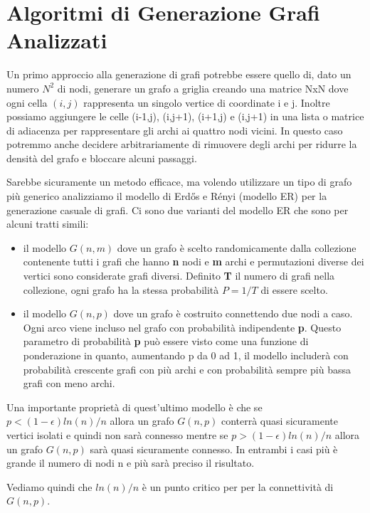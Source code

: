 \documentclass[12pt,a4paper]{report}
\begin{document}
\section{Algoritmi di Generazione Grafi Analizzati}\label{se:algo-gen-anal}
Un primo approccio alla generazione di grafi potrebbe essere quello di, dato un numero $N^2$ di nodi, generare un grafo a griglia creando una matrice NxN dove ogni cella $(i,j)$ rappresenta un singolo vertice di coordinate i e j. 
Inoltre possiamo aggiungere le celle (i-1,j), (i,j+1), (i+1,j) e (i,j+1) in una lista o matrice di adiacenza per rappresentare gli archi ai quattro nodi vicini.
In questo caso potremmo anche decidere arbitrariamente di rimuovere degli archi per ridurre la densità del grafo e bloccare alcuni passaggi.

Sarebbe sicuramente un metodo efficace, ma volendo utilizzare un tipo di grafo più generico analizziamo il modello di Erdős e Rényi \cite{wikipediaErdosRenyiModel} \cite{ErdosRenyiRandomGraphs} (modello ER) per la generazione casuale di grafi.
Ci sono due varianti del modello ER che sono per alcuni tratti simili:
\begin{itemize}
    \item il modello $G(n,m)$ dove un grafo è scelto randomicamente dalla collezione contenente tutti i grafi che hanno \textbf{n} nodi e \textbf{m} archi e permutazioni diverse dei vertici sono considerate grafi diversi. Definito \textbf{T} il numero di grafi nella collezione, ogni grafo ha la stessa probabilità $P=1/T$ di essere scelto.
    \item il modello $G(n,p)$ dove un grafo è costruito connettendo due nodi a caso. Ogni arco viene incluso nel grafo con probabilità indipendente \textbf{p}. Questo parametro di probabilità \textbf{p} può essere visto come una funzione di ponderazione in quanto, aumentando p da 0 ad 1, il modello includerà con probabilità crescente grafi con più archi e con probabilità sempre più bassa grafi con meno archi.
\end{itemize}

Una importante proprietà di quest'ultimo modello è che se \(p<(1-\epsilon)ln(n)/n\) allora un grafo $G(n,p)$ conterrà quasi sicuramente vertici isolati e quindi non sarà connesso mentre se \(p>(1-\epsilon)ln(n)/n\) allora un grafo $G(n,p)$ sarà quasi sicuramente connesso. In entrambi i casi più è grande il numero di nodi n e più sarà preciso il risultato. 

Vediamo quindi che $ln(n)/n$ è un punto critico per per la connettività di $G(n,p)$.
\end{document}
